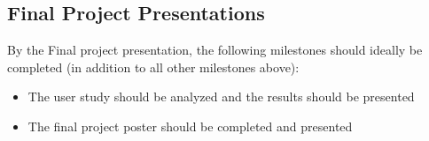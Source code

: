 \subsection{Final Project Presentations}

By the Final project presentation, the following milestones should ideally be completed (in addition to all other milestones above):
\begin{itemize}[noitemsep, topsep=0pt]
    \item The user study should be analyzed and the results should be presented
    \item The final project poster should be completed and presented
\end{itemize}